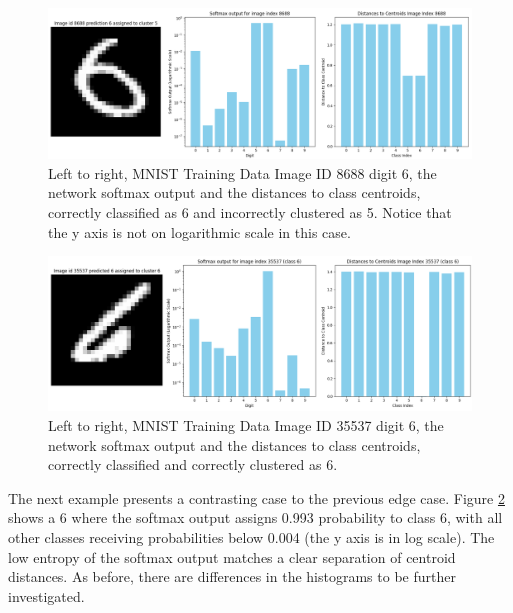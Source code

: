 
\begin{figure}[ht]
    \centering
    \includegraphics[width=0.99\columnwidth]{Figures/Results/ImageID8688_Softmax_Clustering.png}
    \caption{Left to right, MNIST Training Data Image ID 8688 digit 6, the network softmax output and the distances to class centroids, correctly classified as 6 and incorrectly clustered as 5. Notice that the y axis is not on logarithmic scale in this case.     %
    }
\label{fig:ImageID8688_Softmax_Clustering}
\end{figure}

\begin{figure}[ht!]
    \centering
\includegraphics[width=0.99\columnwidth]{Figures/Results/ImageID35537_Softmax_Clustering.png}
    \caption{Left to right, MNIST Training Data Image ID 35537 digit 6, the network softmax output and the distances to class centroids, correctly classified and correctly clustered as 6.     %
    }
\label{fig:ImageID35537_Softmax_Clustering}
\end{figure}

The next example presents a contrasting case to the previous edge case. Figure \ref{fig:ImageID35537_Softmax_Clustering} shows a 6 where the softmax output assigns 0.993 probability to class 6, with all other classes receiving probabilities below 0.004 (the y axis is in log scale). The low entropy of the softmax output matches a clear separation of centroid distances. As before, there are differences in the histograms to be further investigated. 

